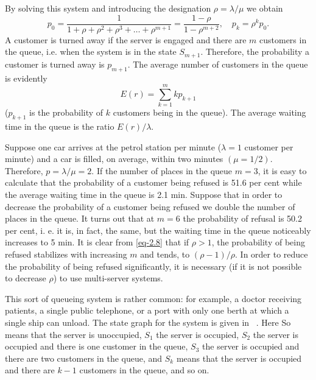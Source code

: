 By solving this system and introducing the designation $\rho = \lambda/\mu$ we obtain
\begin{equation}%
p_{0} = \frac{1}{1 + \rho+ \rho^{2}+ \rho^{3}+ \ldots + \rho^{m+1}} = \frac{1 - \rho}{1 - \rho^{m+2}}, \quad  p_{k}= \rho^{k} p_{0}.
\label{eq-2.8}
\end{equation}
A customer is turned away if the server is engaged and there are $m$ customers in the queue, i.e. when the system is in the state $S_{m+1}$. Therefore, the probability a customer is turned away is $p_{m+1}$. The average number of customers in the queue is evidently
\begin{equation*}%
E(r) = \sum_{k=1}^{m} k p_{k+1}
\end{equation*}
($p_{k+1}$ is the probability of $k$ customers being in the queue). The average
waiting time in the queue is the ratio $E (r)/\lambda$.

Suppose one car arrives at the petrol station per minute ($\lambda = 1$
customer per minute) and a car is filled, on average, within two minutes
$(\mu= 1/2)$. Therefore, $p = \lambda/\mu = 2$. If the number of places in the queue $m = 3$, it is easy to calculate that the probability of a customer being
refused is 51.6 per cent while the average waiting time in the queue is
2.1 min. Suppose that in order to decrease the probability of a customer
being refused we double the number of places in the queue. It turns out
that at $m = 6$ the probability of refusal is 50.2 per cent, i. e. it is, in fact, the same, but the waiting time in the queue noticeably increases to
5 min. It is clear from \eqref{eq-2.8} that if $\rho > 1$, the probability of being refused stabilizes with increasing $m$ and tends, to $(\rho - 1)/\rho$. In order to reduce the probability of being refused significantly, it is necessary (if it is not possible to decrease $\rho$) to use multi-server systems.

 This sort of queueing
system is rather common: for example, a doctor receiving patients,
a single public telephone, or a port with only one berth at which
a single ship can unload. The state graph for the system is given in
~. Here So means that the server is unoccupied, $S_{1}$ the server is occupied, $S_{2}$ the server is occupied and there is one customer in the queue, $S_{3}$ the server is occupied and there are two customers in the queue, and $S_{k}$ means that the server is occupied and there are $k - 1$
customers in the queue, and so on.

